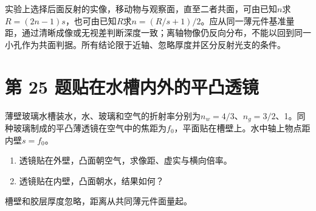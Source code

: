 \documentclass[UTF8,fontset=fandol,a4paper,11pt]{ctexart}
\begin{document}
实验上选择后面反射的实像，移动物与观察面，直至二者共面，可由已知$n$求$R=(2n-1)s$，也可由已知$R$求$n=(R/s+1)/2$。应从同一薄元件基准量距，通过清晰成像或无视差判断深度一致；离轴物像仍反向分布，不能以回到同一小孔作为共面判据。所有结论限于近轴、忽略厚度并区分反射光支的条件。




\section*{第 25 题\quad 贴在水槽内外的平凸透镜}\label{q:25}

薄壁玻璃水槽装水，水、玻璃和空气的折射率分别为$n_w=4/3$、$n_g=3/2$、1。同种玻璃制成的平凸薄透镜在空气中的焦距为$f_0$，平面贴在槽壁上。水中轴上物点距内壁$s=f_0$。
\begin{enumerate}
\item 透镜贴在外壁，凸面朝空气，求像距、虚实与横向倍率。
\item 透镜贴在内壁，凸面朝水，结果如何？
\end{enumerate}
槽壁和胶层厚度忽略，距离从共同薄元件面量起。
\end{document}
